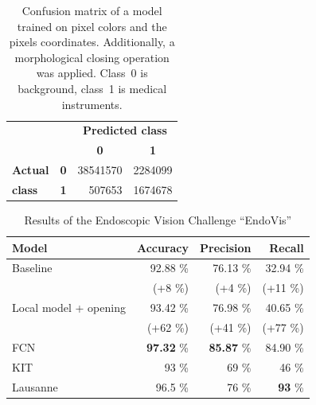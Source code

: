 \begin{appendices}
\begin{table}[ht]
    \centering
    \begin{tabular}{llrr}
    \toprule
    ~                & ~ & \multicolumn{2}{c}{\textbf{Predicted class}}\\
    ~                & ~ & \multicolumn{1}{c}{\textbf{0}} & \multicolumn{1}{c}{\textbf{1}} \\%
    \textbf{Actual}  & \multicolumn{1}{c}{\textbf{0}} & \num{38541570}  & \num{2284099} \\
    \textbf{class}   & \multicolumn{1}{c}{\textbf{1}} &   \num{507653}  & \num{1674678} \\ \bottomrule
    \end{tabular}
    \caption{Confusion matrix of a model trained on pixel colors and the pixels coordinates. Additionally, a morphological closing operation was applied.
             Class~0 is background, class~1 is medical instruments.}
    \label{table:cm-model-303}
\end{table}

\begin{table}[ht]
    \centering
    \begin{tabular}{lrrr}
    \toprule
    \textbf{Model}        & \textbf{Accuracy} & \textbf{Precision} & \textbf{Recall}   \\ \midrule
    Baseline              & 92.88 \%          & 76.13 \%         & 32.94 \% \\
                          & {\tiny (+8 \%)}   & {\tiny (+4 \%)}  & {\tiny (+11 \%)}\\
    Local model + opening & 93.42 \%          & 76.98 \%         & 40.65 \% \\
                          & {\tiny (+62 \%)}  & {\tiny (+41 \%)} & {\tiny (+77 \%)}\\
    FCN                   & \textbf{97.32} \% & \textbf{85.87} \%& 84.90 \% \\ \midrule
    KIT                   & 93 \%             & 69 \%            & 46 \% \\
    Lausanne              & 96.5 \%           & 76 \%            & \textbf{93} \% \\
    \bottomrule
    \end{tabular}
    \caption{Results of the Endoscopic Vision Challenge \enquote{EndoVis}}
    \label{table:challenge-results}
\end{table}

\clearpage

\end{appendices}
